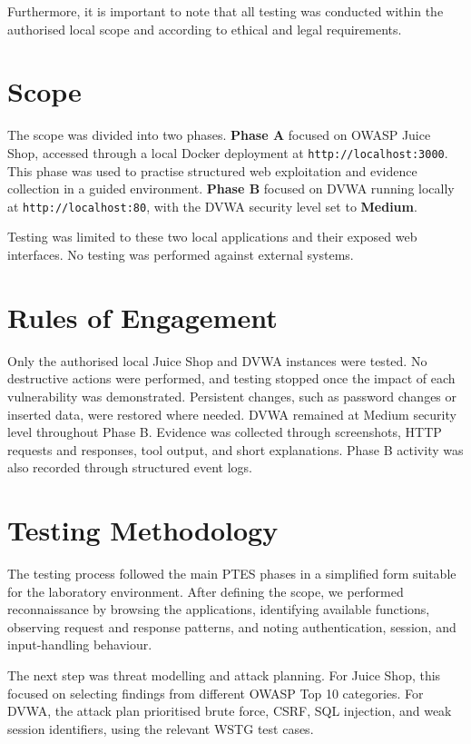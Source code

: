 \documentclass[11pt,a4paper]{report}
\begin{document}
        Furthermore, it is important to note that all testing was conducted within the authorised local scope and according to ethical and legal requirements.

        \section{Scope}

        The scope was divided into two phases. \textbf{Phase A} focused on OWASP Juice Shop, accessed through a local Docker deployment at \texttt{http://localhost:3000}. This phase was used to practise structured web exploitation and evidence collection in a guided environment. \textbf{Phase B} focused on DVWA running locally at \texttt{http://localhost:80}, with the DVWA security level set to \textbf{Medium}.

        Testing was limited to these two local applications and their exposed web interfaces. No testing was performed against external systems.

        \section{Rules of Engagement}

        Only the authorised local Juice Shop and DVWA instances were tested. No destructive actions were performed, and testing stopped once the impact of each vulnerability was demonstrated. Persistent changes, such as password changes or inserted data, were restored where needed. DVWA remained at Medium security level throughout Phase B. Evidence was collected through screenshots, HTTP requests and responses, tool output, and short explanations. Phase B activity was also recorded through structured event logs.

        \newpage

        \section{Testing Methodology}

        The testing process followed the main PTES phases in a simplified form suitable for the laboratory environment. After defining the scope, we performed reconnaissance by browsing the applications, identifying available functions, observing request and response patterns, and noting authentication, session, and input-handling behaviour.

        The next step was threat modelling and attack planning. For Juice Shop, this focused on selecting findings from different OWASP Top 10 categories. For DVWA, the attack plan prioritised brute force, CSRF, SQL injection, and weak session identifiers, using the relevant WSTG test cases.
\end{document}
